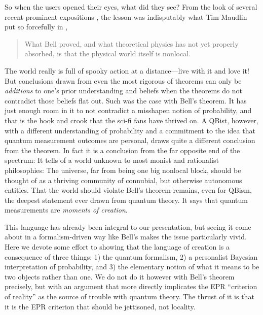 \documentclass[aps,pra,superscriptaddress,10pt,tightenlines,twocolumn,nofootinbib]{revtex4}
\begin{document}
So when the users opened their eyes, what did they see?  From the look of several recent prominent expositions \cite{Gisin09,Albert09,Norsen06}, the lesson was indisputably what Tim Maudlin put so forcefully in \cite{Maudlin14},
\begin{quote}
What Bell proved, and what theoretical physics
has not yet properly absorbed, is that the physical
world itself is nonlocal.
\end{quote}
The world really is full of spooky action at a distance---live with it and love it!  But conclusions drawn from even the most rigorous of theorems can only be {\it additions\/} to one's prior understanding and beliefs when the theorems do not contradict those beliefs flat out.  Such was the case with Bell's theorem.  It has just enough room in it to not contradict a misshapen notion of probability, and that is the hook and crook that the sci-fi fans have thrived on.  A QBist, however, with a different understanding of probability and a commitment to the idea that quantum measurement outcomes are personal, draws quite a different conclusion from the theorem.  In fact it is a conclusion from the far opposite end of the spectrum:  It tells of a world unknown to most monist and rationalist philosophies:  The universe, far from being one big nonlocal block, should be thought of as a thriving community of connubial, but otherwise autonomous entities.   That the world should violate Bell's theorem remains, even for QBism, the deepest statement ever drawn from quantum theory.  It says that quantum measurements are {\it moments of creation}.

This language has already been integral to our presentation, but seeing it come about in a formalism-driven way like Bell's makes the issue particularly vivid.  Here we devote some effort to showing that the language of creation is a consequence of three things:  1) the quantum formalism, 2) a personalist Bayesian interpretation of probability, and 3) the elementary notion of what it means to be two objects rather than one.  We do not do it however with Bell's theorem precisely, but with an argument that more directly implicates the EPR ``criterion of reality'' as the source of trouble with quantum theory.  The thrust of it is that it is the EPR criterion that should be jettisoned, not locality.
\end{document}
